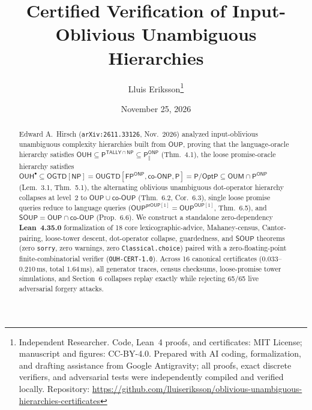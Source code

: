 \documentclass[10pt,twocolumn]{article}
\title{\vspace{-1.1em}\textbf{Certified Verification of Input-Oblivious Unambiguous Hierarchies}}
\author{Lluis Eriksson\thanks{Independent Researcher. Code, Lean~4 proofs, and certificates: MIT License; manuscript and figures: CC-BY-4.0. Prepared with AI coding, formalization, and drafting assistance from Google Antigravity; all proofs, exact discrete verifiers, and adversarial tests were independently compiled and verified locally. Repository: \url{https://github.com/lluiseriksson/oblivious-unambiguous-hierarchies-certificates}}}
\date{November 25, 2026}
\newcommand{\NP}{\mathsf{NP}}
\newcommand{\ONP}{\mathsf{ONP}}
\newcommand{\OUP}{\mathsf{OUP}}
\newcommand{\SOUP}{\mathsf{SOUP}}
\newcommand{\OUH}{\mathsf{OUH}}
\newcommand{\OUM}{\mathsf{OUM}}
\newcommand{\OGTD}{\mathsf{OGTD}}
\newcommand{\OUGTD}{\mathsf{OUGTD}}
\begin{document}
\maketitle
\vspace{-1.4em}

\begin{abstract}
Edward A.\ Hirsch (\texttt{arXiv:2611.33126}, Nov.\ 2026) analyzed input-oblivious unambiguous complexity hierarchies built from $\OUP$, proving that the language-oracle hierarchy satisfies $\OUH \subseteq \mathsf{P}^{\mathsf{TALLY}\cap\NP} \subseteq \mathsf{P}^{\ONP}_\parallel$ (Thm.~4.1), the loose promise-oracle hierarchy satisfies $\OUH^\bullet \subseteq \OGTD[\NP] = \OUGTD[\mathsf{FP}^{\ONP}, \mathsf{co}\text{-}\ONP, \mathsf{P}] = \mathsf{P}/\mathsf{OptP} \subseteq \OUM \cap \mathsf{P}^{\ONP}$ (Lem.~3.1, Thm.~5.1), the alternating oblivious unambiguous dot-operator hierarchy collapses at level~2 to $\OUP \cup \mathsf{co}\text{-}\OUP$ (Thm.~6.2, Cor.~6.3), single loose promise queries reduce to language queries ($\OUP^{\mathsf{prOUP}[1]} = \OUP^{\OUP[1]}$, Thm.~6.5), and $\SOUP = \OUP \cap \mathsf{co}\text{-}\OUP$ (Prop.~6.6). We construct a standalone zero-dependency \textbf{Lean~4.35.0} formalization of 18 core lexicographic-advice, Mahaney-census, Cantor-pairing, loose-tower descent, dot-operator collapse, guardedness, and $\SOUP$ theorems (zero \texttt{sorry}, zero warnings, zero \texttt{Classical.choice}) paired with a zero-floating-point finite-combinatorial verifier (\texttt{OUH-CERT-1.0}). Across 16 canonical certificates ($0.033$--$0.210\,\mathrm{ms}$, total $1.64\,\mathrm{ms}$), all generator traces, census checksums, loose-promise tower simulations, and Section~6 collapses replay exactly while rejecting 65/65 live adversarial forgery attacks.
\end{abstract}
\end{document}
